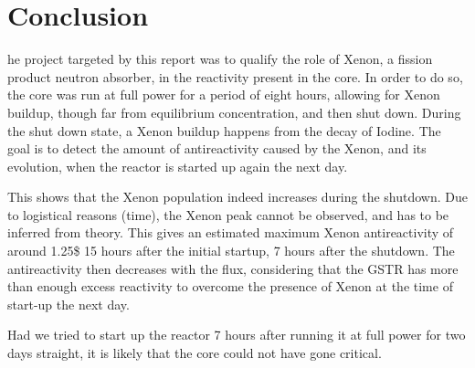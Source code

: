 %
%
\let\textcircled=\pgftextcircled
\chapter{Conclusion}
\label{chap:conclusion}

he project targeted by this report was to qualify the role of Xenon, a fission product neutron absorber, in the reactivity present in the core. In order to do so, the core was run at full power for a period of eight hours, allowing for Xenon buildup, though far from equilibrium concentration, and then shut down. During the shut down state, a Xenon buildup happens from the decay of Iodine. The goal is to detect the amount of antireactivity caused by the Xenon, and its evolution, when the reactor is started up again the next day.

This shows that the Xenon population indeed increases during the shutdown. Due to logistical reasons (time), the Xenon peak cannot be observed, and has to be inferred from theory. This gives an estimated maximum Xenon antireactivity of around 1.25\$ 15 hours after the initial startup, 7 hours after the shutdown. The antireactivity then decreases with the flux, considering that the GSTR has more than enough excess reactivity to overcome the presence of Xenon at the time of start-up the next day.

Had we tried to start up the reactor 7 hours after running it at full power for two days straight, it is likely that the core could not have gone critical.



